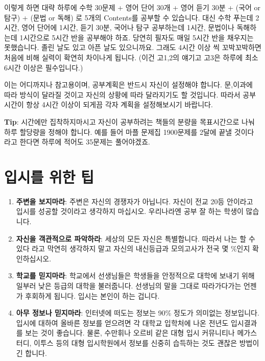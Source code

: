 \documentclass[final]{IEEEphot}
\begin{document}
이렇게 하면 대략 하루에 수학 30문제 + 영어 단어 30개 + 영어 듣기 30분 + (국어 or 탐구) + (문법 or 독해) 로 5개의 Contents를 공부할 수 있습니다.
대신 수학 푸는데 2시간, 영어 단어에 1시간, 듣기 30분, 국어나 탐구 공부하는데 1시간, 문법이나 독해하는데 1시간으로 5시간 반을 공부해야 하죠. 당연히 필자도 매일 5시간 반을 채우지는 못했습니다.
졸린 날도 있고 아픈 날도 있으니까요. 그래도 4시간 이상 씩 꼬박꼬박하면 처음에 비해 실력이 확연히 차이나게 됩니다. (이건 고1,2의 얘기고 고3은 하루에 최소 6시간 이상은 필수입니다.)

이는 어디까지나 참고용이며, 공부계획은 반드시 자신이 설정해야 합니다. 문,이과에 따라 방식이 달라질 것이고 자신의 상황에 따라 달라지기도 할 것입니다.
따라서 공부시간이 항상 4시간 이상이 되게끔 각자 계획을 설정해보시기 바랍니다. 
\vspace{0.2cm}

\textbf{Tip}: 시간에만 집착하지마시고 자신이 공부하려는 책들의 분량을 목표시간으로 나눠 하루 할당량을 정해야 합니다. 예를 들어 마플 문제집 1900문제를 2달에 끝낼 것이다 라고 한다면 하루에 적어도
35문제는 풀어야겠죠.

\section{입시를 위한 팁}

\vspace{0.1cm}

\begin{enumerate}
 \item \textbf{주변을 보지마라}: 주변은 자신의 경쟁자가 아닙니다. 자신이 전교 20등 안이라고 입시를 성공할 것이라고 생각하지 마십시오. 우리나라엔 공부 잘 하는 학생이 많습니다.\vspace{0.1cm}
 \item \textbf{자신을 객관적으로 파악하라}: 세상의 모든 자신은 특별합니다. 따라서 나는 할 수 있다 라고 막연히 생각하지 말고 자신의 내신등급과 모의고사가 전국 몇 \%인지 확인하십시오. \vspace{0.1cm}
 \item \textbf{학교를 믿지마라}: 학교에서 선생님들은 학생들을 안정적으로 대학에 보내기 위해 일부러 낮은 등급의 대학을 불러줍니다. 선생님의 말을 그대로 따라가다가는 언젠가 후회하게 됩니다.
 입시는 본인이 하는 겁니다. \vspace{0.1cm}
 \item \textbf{아무 정보나 믿지마라}: 인터넷에 떠도는 정보는 90\% 정도가 의미없는 정보입니다. 입시에 대하여 올바른 정보를 얻으려면 각 대학교 입학처에 나온 전년도 입시결과를 보는 것이 좋습니다.
 물론, 수만휘나 오르비 같은 대형 입시 커뮤니티나 메가스터디, 이투스 등의 대형 입시학원에서 정보를 신중히 습득하는 것도 괜찮은 방법이긴 합니다. \vspace{0.1cm}
\end{enumerate}
\end{document}
